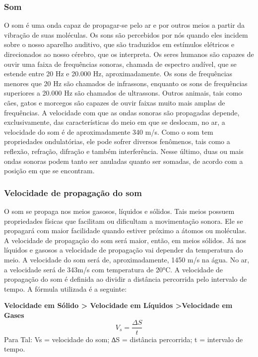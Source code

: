 \documentclass[
	article,			%
	11pt,				%
	oneside,			%
	a4paper,			%
	english,			%
	brazil,				%
	sumario=tradicional
	]{abntex2}
\begin{document}
\subsubsection{Som}
	O som é uma onda capaz de propagar-se pelo ar e por outros meios a partir da vibração de suas moléculas. Os sons são percebidos por nós quando eles incidem sobre o nosso aparelho auditivo, que são traduzidos em estímulos elétricos e direcionados ao nosso cérebro, que os interpreta.
Os seres humanos são capazes de ouvir uma faixa de frequências sonoras, chamada de espectro audível, que se estende entre 20 Hz e 20.000 Hz, aproximadamente. Os sons de frequências menores que 20 Hz são chamados de infrassons, enquanto os sons de frequências superiores a 20.000 Hz são chamados de ultrassons. Outros animais, tais como cães, gatos e morcegos são capazes de ouvir faixas muito mais amplas de frequências.
A velocidade com que as ondas sonoras são propagadas depende, exclusivamente, das características do meio em que se deslocam, no ar, a velocidade do som é de aproximadamente 340 m/s.
Como o som tem propriedades ondulatórias, ele pode sofrer diversos fenômenos, tais como a reflexão, refração, difração e também interferência. Nesse último, duas ou mais ondas sonoras podem tanto ser anuladas quanto ser somadas, de acordo com a posição em que se encontram.	
\subsubsection{Velocidade de propagação do som}
O som se propaga nos meios gasosos, líquidos e sólidos. Tais meios possuem propriedades físicas que facilitam ou dificultam a movimentação sonora. Ele se propagará com maior facilidade quando estiver próximo a átomos ou moléculas. A velocidade de propagação do som será maior, então, em meios sólidos. Já nos líquidos e gasosos a velocidade de propagação vai depender da temperatura do meio. A velocidade do som será de, aproximadamente, 1450 m/s na água. No ar, a velocidade será de 343m/s com temperatura de 20°C. 
A velocidade de propagação do som é definida ao dividir a distância percorrida pelo intervalo de tempo. A fórmula utilizada é a seguinte:
\begin{center}
	\textbf{Velocidade em Sólido > Velocidade em Líquidos >Velocidade em Gases}\\
    \begin{equation}
        V_s = \frac{\Delta S}{t}
    \end{equation}
    Para Tal: 
    Vs = velocidade do som;
    ∆S = distância percorrida;
    t = intervalo de tempo.
\end{center}
\end{document}
